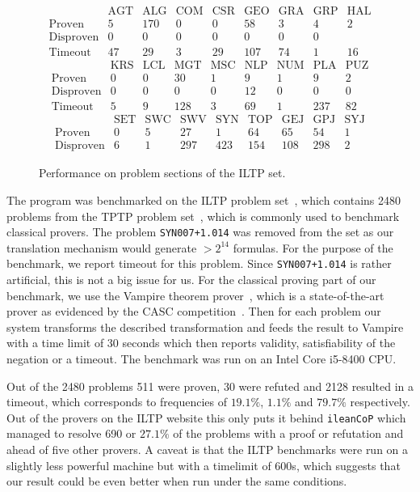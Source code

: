 \documentclass[a4paper,11pt]{report}
\theoremstyle{definition}
\theoremstyle{definition}
\theoremstyle{definition}
\theoremstyle{definition}
\theoremstyle{definition}
\theoremstyle{definition}
\theoremstyle{definition}
\begin{document}
	\begin{figure}[h]
		$$\begin{matrix}
			&\text{AGT}&\text{ALG}&\text{COM}&\text{CSR}&\text{GEO}&\text{GRA}&\text{GRP}&\text{HAL}\\
			\text{Proven}&5&170&0&0&58&3&4&2\\
			\text{Disproven}&0&0&0&0&0&0&0&\\
			\text{Timeout}&47&29&3&29&107&74&1&16
		\end{matrix}$$
		$$\begin{matrix}
			&\text{KRS}&\text{LCL}&\text{MGT}&\text{MSC}&\text{NLP}&\text{NUM}&\text{PLA}&\text{PUZ}\\
			\text{Proven}&0&0&30&1&9&1&9&2\\
			\text{Disproven}&0&0&0&0&12&0&0&0\\
			\text{Timeout}&5&9&128&3&69&1&237&82
		\end{matrix}$$
		$$\begin{matrix}
			&\text{SET}&\text{SWC}&\text{SWV}&\text{SYN}&\text{TOP}&\text{GEJ}&\text{GPJ}&\text{SYJ}\\
			\text{Proven}&0&5&27&1&64&65&54&1\\
			\text{Disproven}&6&1&297&423&154&108&298&2
		\end{matrix}$$
		\caption{Performance on problem sections of the ILTP set.}
		\label{results-bench}
	\end{figure}
	
	The program was benchmarked on the ILTP problem set~\cite{iltp}, which contains 2480 problems from the TPTP problem set~\cite{tptp}, which is commonly used to benchmark classical provers. The problem \lstinline|SYN007+1.014| was removed from the set as our translation mechanism would generate $>2^{14}$ formulas. For the purpose of the benchmark, we report timeout for this problem. Since \lstinline|SYN007+1.014| is rather artificial, this is not a big issue for us. For the classical proving part of our benchmark, we use the Vampire theorem prover~\cite{Kov_cs_2013}, which is a state-of-the-art prover as evidenced by the CASC competition~\cite{casc}. Then for each problem our system transforms the described transformation and feeds the result to Vampire with a time limit of 30 seconds which then reports validity, satisfiability of the negation or a timeout. The benchmark was run on an Intel Core i5-8400 CPU.

	Out of the 2480 problems 511 were proven, 30 were refuted and 2128 resulted in a timeout, which corresponds to frequencies of $19.1\%$, $1.1\%$ and $79.7\%$ respectively. Out of the provers on the ILTP website this only puts it behind \lstinline|ileanCoP| which managed to resolve 690 or $27.1\%$ of the problems with a proof or refutation and ahead of five other provers. A caveat is that the ILTP benchmarks were run on a slightly less powerful machine but with a timelimit of 600s, which suggests that our result could be even better when run under the same conditions.
	
\end{document}

